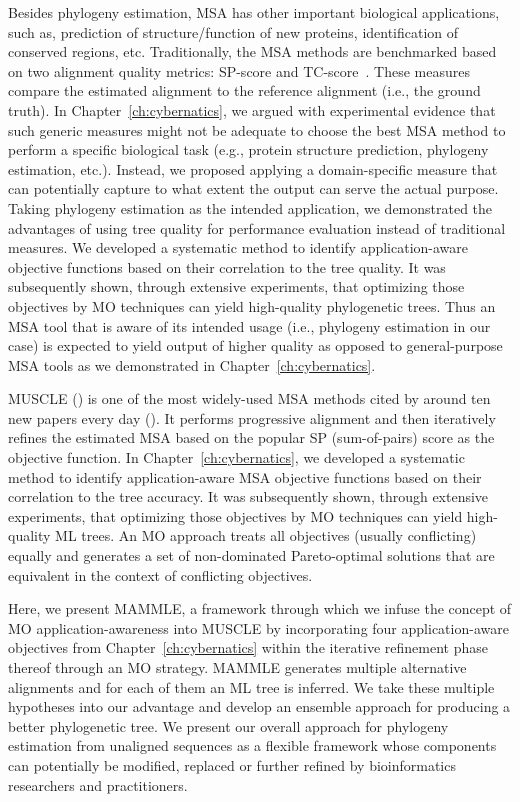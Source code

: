Besides phylogeny estimation, MSA has other important biological applications, such as, prediction of structure/function of new proteins, identification of conserved regions, etc. Traditionally, the MSA methods are benchmarked based on two alignment quality metrics: SP-score and TC-score~\cite{warnow2017computational}. These measures compare the estimated alignment to the reference alignment (i.e., the ground truth). In Chapter~\ref{ch:cybernatics}, we argued with experimental evidence that such generic measures might not be adequate to choose the best MSA method to perform a specific biological task (e.g., protein structure prediction, phylogeny estimation, etc.). Instead, we proposed applying a domain-specific measure that can potentially capture to what extent the output can serve the actual purpose. Taking phylogeny estimation as the intended application, we demonstrated the advantages of using tree quality for performance evaluation instead of traditional measures. We developed a systematic method to identify application-aware objective functions based on their correlation to the tree quality. It was subsequently shown, through extensive experiments, that optimizing those objectives by MO techniques can yield high-quality phylogenetic trees. Thus an MSA tool that is aware of its intended usage (i.e., phylogeny estimation in our case) is expected to yield output of higher quality as opposed to general-purpose MSA tools as we demonstrated in Chapter~\ref{ch:cybernatics}. 

MUSCLE (\cite{edgar2004muscle}) is one of the most widely-used MSA methods cited by around ten new papers every day (\cite{muscle-web}). It performs progressive alignment and then iteratively refines the estimated MSA based on the popular SP (sum-of-pairs) score as the objective function. In Chapter~\ref{ch:cybernatics}, we developed a systematic method to identify application-aware MSA objective functions based on their correlation to the tree accuracy. It was subsequently shown, through extensive experiments, that optimizing those objectives by MO techniques can yield high-quality ML trees. An MO approach treats all objectives (usually conflicting) equally and generates a set of non-dominated Pareto-optimal solutions that are equivalent in the context of conflicting objectives. 

Here, we present MAMMLE, a framework through which we infuse the concept of MO application-awareness into MUSCLE by incorporating four application-aware objectives from Chapter~\ref{ch:cybernatics} within the iterative refinement phase thereof through an MO strategy. MAMMLE generates multiple alternative alignments and for each of them an ML tree is inferred. We take these multiple hypotheses into our advantage and develop an ensemble approach for producing a better phylogenetic tree. We present our overall approach for phylogeny estimation from unaligned sequences as a flexible framework whose components can potentially be modified, replaced or further refined by bioinformatics researchers and practitioners.

